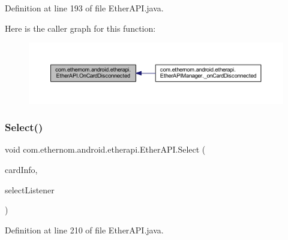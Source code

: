 Definition at line 193 of file Ether\+A\+P\+I.\+java.

Here is the caller graph for this function\+:\nopagebreak
\begin{figure}[H]
\begin{center}
\leavevmode
\includegraphics[width=350pt]{classcom_1_1ethernom_1_1android_1_1etherapi_1_1_ether_a_p_i_af4bf0cd04217e9ffc746a142deefd261_icgraph}
\end{center}
\end{figure}
\mbox{\label{classcom_1_1ethernom_1_1android_1_1etherapi_1_1_ether_a_p_i_a12e73d4fe631c9817166a1a16ee05949}} 
\subsubsection{\texorpdfstring{Select()}{Select()}}
{\footnotesize\ttfamily void com.\+ethernom.\+android.\+etherapi.\+Ether\+A\+P\+I.\+Select (\begin{DoxyParamCaption}\item[{\mbox{\hyperlink{classcom_1_1ethernom_1_1android_1_1etherapi_1_1_card_info}{Card\+Info}}}]{card\+Info,  }\item[{final \mbox{\hyperlink{interfacecom_1_1ethernom_1_1android_1_1etherapi_1_1_select_listener}{Select\+Listener}}}]{select\+Listener }\end{DoxyParamCaption})}



Definition at line 210 of file Ether\+A\+P\+I.\+java.

